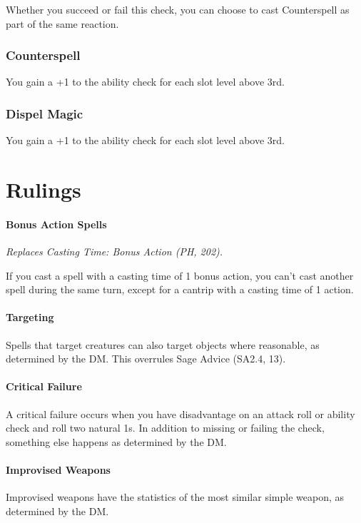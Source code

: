 \documentclass[letterpaper,twocolumn,openany,nodeprecatedcode]{dndbook}
\begin{document}
Whether you succeed or fail this check, you can choose to cast Counterspell as part of the same reaction.

\subsection{Counterspell}
You gain a +1 to the ability check for each slot level above 3rd.

\subsection{Dispel Magic}
You gain a +1 to the ability check for each slot level above 3rd.



\chapter{Rulings}

\subsubsection{Bonus Action Spells}
\textit{Replaces Casting Time: Bonus Action (PH, 202).}

If you cast a spell with a casting time of 1 bonus action, you can't cast another spell during the same turn, except for a cantrip with a casting time of 1 action.

\subsubsection{Targeting}
Spells that target creatures can also target objects where reasonable, as determined by the DM. This overrules Sage Advice (SA2.4, 13).



\subsubsection{Critical Failure}
A critical failure occurs when you have disadvantage on an attack roll or ability check and roll two natural 1s. In addition to missing or failing the check, something else happens as determined by the DM. 



\subsubsection{Improvised Weapons}
Improvised weapons have the statistics of the most similar simple weapon, as determined by the DM.
\end{document}
